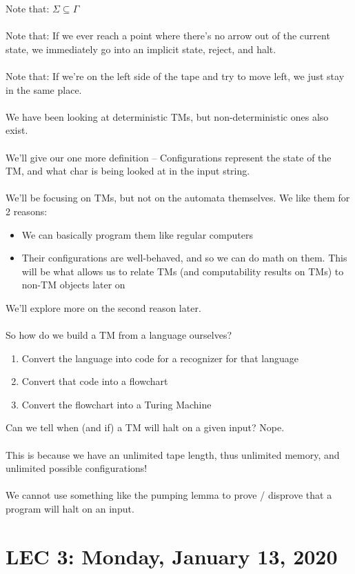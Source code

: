 \documentclass[12pt]{article}
\begin{document}
Note that: $\Sigma \subseteq \Gamma$
\\
\\
Note that: If we ever reach a point where there's no arrow out of the current state, we immediately go into an implicit state, reject, and halt.
\\
\\
Note that: If we're on the left side of the tape and try to move left, we just stay in the same place.
\\
\\
We have been looking at deterministic TMs, but non-deterministic ones also exist.
\\
\\
We'll give our one more definition -- Configurations represent the state of the TM, and what char is being looked at in the input string.
\\
\\
We'll be focusing on TMs, but not on the automata themselves. We like them for 2 reasons:
\begin{itemize}
    \item We can basically program them like regular computers
    \item Their configurations are well-behaved, and so we can do math on them. This will be what allows us to relate TMs (and computability results on TMs) to non-TM objects later on
\end{itemize}
We'll explore more on the second reason later.
\\
\\
So how do we build a TM from a language ourselves?
\begin{enumerate}
    \item Convert the language into code for a recognizer for that language
    \item Convert that code into a flowchart
    \item Convert the flowchart into a Turing Machine
\end{enumerate}

Can we tell when (and if) a TM will halt on a given input? Nope.
\\
\\
This is because we have an unlimited tape length, thus unlimited memory, and unlimited possible configurations!
\\
\\
We cannot use something like the pumping lemma to prove / disprove that a program will halt on an input.

\section{LEC 3: Monday, January 13, 2020}
\end{document}
